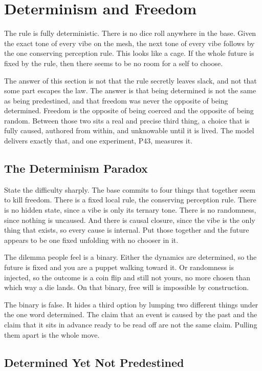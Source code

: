 \section{Determinism and Freedom}

The rule is fully deterministic. There is no dice roll anywhere in the base. Given the exact tone of every vibe on the mesh, the next tone of every vibe follows by the one conserving perception rule. This looks like a cage. If the whole future is fixed by the rule, then there seems to be no room for a self to choose.

The answer of this section is not that the rule secretly leaves slack, and not that some part escapes the law. The answer is that being determined is not the same as being predestined, and that freedom was never the opposite of being determined. Freedom is the opposite of being coerced and the opposite of being random. Between those two sits a real and precise third thing, a choice that is fully caused, authored from within, and unknowable until it is lived. The model delivers exactly that, and one experiment, P43, measures it.

\subsection{The Determinism Paradox}

State the difficulty sharply. The base commits to four things that together seem to kill freedom. There is a fixed local rule, the conserving perception rule. There is no hidden state, since a vibe is only its ternary tone. There is no randomness, since nothing is uncaused. And there is causal closure, since the vibe is the only thing that exists, so every cause is internal. Put those together and the future appears to be one fixed unfolding with no chooser in it.

The dilemma people feel is a binary. Either the dynamics are determined, so the future is fixed and you are a puppet walking toward it. Or randomness is injected, so the outcome is a coin flip and still not yours, no more chosen than which way a die lands. On that binary, free will is impossible by construction.

The binary is false. It hides a third option by lumping two different things under the one word determined. The claim that an event is caused by the past and the claim that it sits in advance ready to be read off are not the same claim. Pulling them apart is the whole move.

\subsection{Determined Yet Not Predestined}


